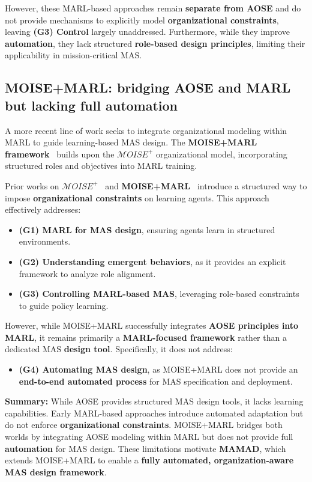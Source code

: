 \documentclass[pdflatex,sn-mathphys-num]{sn-jnl}%
\theoremstyle{thmstyleone}%
\theoremstyle{thmstyletwo}%
\theoremstyle{thmstylethree}%
\begin{document}
However, these MARL-based approaches remain \textbf{separate from AOSE} and do not provide mechanisms to explicitly model \textbf{organizational constraints}, leaving \textbf{(G3) Control} largely unaddressed. Furthermore, while they improve \textbf{automation}, they lack structured \textbf{role-based design principles}, limiting their applicability in mission-critical MAS.

\subsection{MOISE+MARL: bridging AOSE and MARL but lacking full automation}

A more recent line of work seeks to integrate organizational modeling within MARL to guide learning-based MAS design. The \textbf{MOISE+MARL framework}~\cite{soule2025moisemarl} builds upon the \textbf{$\mathcal{M}OISE^+$} organizational model, incorporating structured roles and objectives into MARL training. 

Prior works on $\mathcal{M}OISE^+$~\cite{hubner2007moise} and \textbf{MOISE+MARL}~\cite{soule2025moisemarl} introduce a structured way to impose \textbf{organizational constraints} on learning agents. This approach effectively addresses:
%
\begin{itemize}
    \item \textbf{(G1) MARL for MAS design}, ensuring agents learn in structured environments.
    \item \textbf{(G2) Understanding emergent behaviors}, as it provides an explicit framework to analyze role alignment.
    \item \textbf{(G3) Controlling MARL-based MAS}, leveraging role-based constraints to guide policy learning.
\end{itemize}

However, while MOISE+MARL successfully integrates \textbf{AOSE principles into MARL}, it remains primarily a \textbf{MARL-focused framework} rather than a dedicated MAS \textbf{design tool}. Specifically, it does not address:
%
\begin{itemize}
    \item \textbf{(G4) Automating MAS design}, as MOISE+MARL does not provide an \textbf{end-to-end automated process} for MAS specification and deployment.
\end{itemize}

\medskip

\noindent \textbf{Summary:} While AOSE provides structured MAS design tools, it lacks learning capabilities. Early MARL-based approaches introduce automated adaptation but do not enforce \textbf{organizational constraints}. MOISE+MARL bridges both worlds by integrating AOSE modeling within MARL but does not provide full \textbf{automation} for MAS design. These limitations motivate \textbf{MAMAD}, which extends MOISE+MARL to enable a \textbf{fully automated, organization-aware MAS design framework}.
\end{document}
